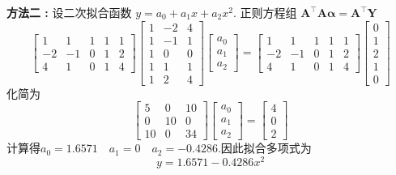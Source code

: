 \begin{tcolorbox}
\textbf{方法二 :}
设二次拟合函数 $ y=a_{0}+a_{1} x+a_{2} x^{2} $.
正则方程组 $ \boldsymbol{A}^{\top} \boldsymbol{A} \boldsymbol{\alpha}=\boldsymbol{A}^{\top} \boldsymbol{Y} $
$$
\left[\begin{array}{rrrrr}
1 & 1 & 1 & 1 & 1 \\
-2 & -1 & 0 & 1 & 2 \\
4 & 1 & 0 & 1 & 4
\end{array}\right]\left[\begin{array}{rrr}
1 & -2 & 4 \\
1 & -1 & 1 \\
1 & 0 & 0 \\
1 & 1 & 1 \\
1 & 2 & 4
\end{array}\right]\left[\begin{array}{l}
a_{0} \\
a_{1} \\
a_{2}
\end{array}\right]=\left[\begin{array}{rrrrr}
1 & 1 & 1 & 1 & 1 \\
-2 & -1 & 0 & 1 & 2 \\
4 & 1 & 0 & 1 & 4
\end{array}\right]\left[\begin{array}{l}
0 \\
1 \\
2 \\
1 \\
0
\end{array}\right]
$$
化简为
$$
\left[\begin{array}{rrr}
5 & 0 & 10 \\
0 & 10 & 0 \\
10 & 0 & 34
\end{array}\right]\left[\begin{array}{l}
a_{0} \\
a_{1} \\
a_{2}
\end{array}\right]=\left[\begin{array}{l}
4 \\
0 \\
2
\end{array}\right]
$$
计算得$a_{0}=1.6571 \quad a_{1}=0 \quad a_{2}=-0.4286$.因此拟合多项式为
$$
y=1.6571-0.4286 x^{2}
$$


\end{tcolorbox}
